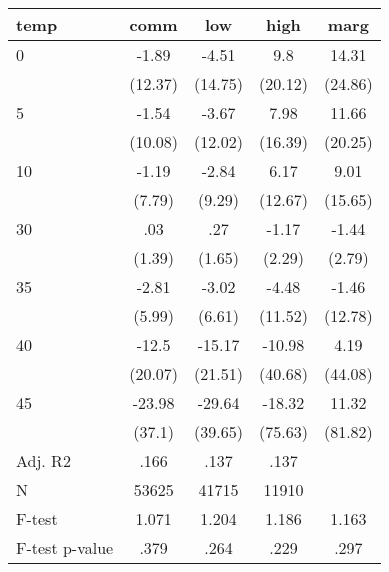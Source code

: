 \documentclass[]{article}
\begin{document}
\begin{tabular}{lcccc} \hline
temp & comm & low & high & marg \\ \hline
0 & -1.89 & -4.51 & 9.8 & 14.31 \\
 & (12.37) & (14.75) & (20.12) & (24.86) \\
5 & -1.54 & -3.67 & 7.98 & 11.66 \\
 & (10.08) & (12.02) & (16.39) & (20.25) \\
10 & -1.19 & -2.84 & 6.17 & 9.01 \\
 & (7.79) & (9.29) & (12.67) & (15.65) \\
30 & .03 & .27 & -1.17 & -1.44 \\
 & (1.39) & (1.65) & (2.29) & (2.79) \\
35 & -2.81 & -3.02 & -4.48 & -1.46 \\
 & (5.99) & (6.61) & (11.52) & (12.78) \\
40 & -12.5 & -15.17 & -10.98 & 4.19 \\
 & (20.07) & (21.51) & (40.68) & (44.08) \\
45 & -23.98 & -29.64 & -18.32 & 11.32 \\
 & (37.1) & (39.65) & (75.63) & (81.82) \\
\hline Adj. R2 & .166 & .137 & .137 &  \\
N & 53625 & 41715 & 11910 &  \\
F-test & 1.071 & 1.204 & 1.186 & 1.163 \\
 F-test p-value & .379 & .264 & .229 & .297 \\ \hline
\end{tabular}
\end{document}
